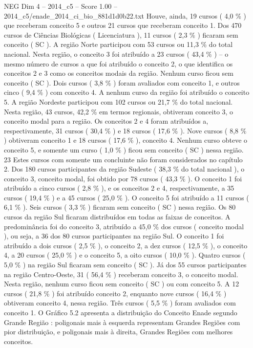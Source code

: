 \begin{textsample}{NEG Dim 4 – 2014\_c5 – Score 1.00 – 2014\_c5/enade\_2014\_ci\_bio\_881d1d0b22.txt}
Houve, ainda, 19 cursos ( 4,0 \% ) que receberam conceito 5 e outros 21 cursos que receberam conceito 1.
Dos 470 cursos de Ciências Biológicas ( Licenciatura ), 11 cursos ( 2,3 \% ) ficaram sem conceito ( SC ).
A região Norte participou com 53 cursos ou 11,3 \% do total nacional.
Nesta região, o conceito 3 foi atribuído a 23 cursos ( 43,4 \% ) – o mesmo número de cursos a que foi atribuído o conceito 2, o que identifica os conceitos 2 e 3 como os conceitos modais da região.
Nenhum curso ficou sem conceito ( SC ).
Dois cursos ( 3,8 \% ) foram avaliados com conceito 1, e outros cinco ( 9,4 \% ) com conceito 4.
A nenhum curso da região foi atribuído o conceito 5.
A região Nordeste participou com 102 cursos ou 21,7 \% do total nacional.
Nesta região, 43 cursos, 42,2 \% em termos regionais, obtiveram conceito 3, o conceito modal para a região.
Os conceitos 2 e 4 foram atribuídos a, respectivamente, 31 cursos ( 30,4 \% ) e 18 cursos ( 17,6 \% ).
Nove cursos ( 8,8 \% ) obtiveram conceito 1 e 18 cursos ( 17,6 \% ), conceito 4.
Nenhum curso obteve o conceito 5, e somente um curso ( 1,0 \% ) ficou sem conceito ( SC ) nessa região. 23 Estes cursos com somente um concluinte não foram considerados no capítulo 2.
Dos 180 cursos participantes da região Sudeste ( 38,3 \% do total nacional ), o conceito 3, conceito modal, foi obtido por 78 cursos ( 43,3 \% ).
O conceito 1 foi atribuído a cinco cursos ( 2,8 \% ), e os conceitos 2 e 4, respectivamente, a 35 cursos ( 19,4 \% ) e a 45 cursos ( 25,0 \% ).
O conceito 5 foi atribuído a 11 cursos ( 6,1 \% ).
Seis cursos ( 3,3 \% ) ficaram sem conceito ( SC ) nessa região.
Os 80 cursos da região Sul ficaram distribuídos em todas as faixas de conceitos.
A predominância foi do conceito 3, atribuído a 45,0 \% dos cursos ( conceito modal ), ou seja, a 36 dos 80 cursos participantes na região Sul.
O conceito 1 foi atribuído a dois cursos ( 2,5 \% ), o conceito 2, a dez cursos ( 12,5 \% ), o conceito 4, a 20 cursos ( 25,0 \% ) e o conceito 5, a oito cursos ( 10,0 \% ).
Quatro cursos ( 5,0 \% ) na região Sul ficaram sem conceito ( SC ).
Já dos 55 cursos participantes na região Centro-Oeste, 31 ( 56,4 \% ) receberam conceito 3, o conceito modal.
Nesta região, nenhum curso ficou sem conceito ( SC ) ou com conceito 5.
A 12 cursos ( 21,8 \% ) foi atribuído conceito 2, enquanto nove cursos ( 16,4 \% ) obtiveram conceito 4, nessa região.
Três cursos ( 5,5 \% ) foram avaliados com conceito 1.
O Gráfico 5.2 apresenta a distribuição do Conceito Enade segundo Grande Região : poligonais mais à esquerda representam Grandes Regiões com pior distribuição, e poligonais mais à direita, Grandes Regiões com melhores conceitos.

\end{textsample}
